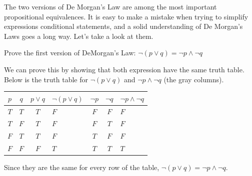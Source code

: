 The two versions of De Morgan's Law
are among the most important propositional equivalences.
It is easy to make a mistake when trying to simplify expressions conditional statements, 
and a solid understanding of De Morgan's
Laws goes a long way.  Let's take a look at them.


\begin{exa}
Prove the first version of DeMorgan's Law: 
 $\neg (p\vee q) = \neg p \wedge \neg q$
\begin{pf}
We can prove this by showing that both expression have the same truth table.
Below is the truth table for $\neg (p\vee q)$ and  $\neg p \wedge \neg q$ (the gray columns).

\centering
\begin{tabular}{|cc|c|g|c|c|g|} \hline $p$ & $q$ & $p\vee q$ &
$\neg (p\vee q)$ & $\neg p$ &
$\neg q$ & $\neg p \wedge \neg q$ \\
\hline 
$T$ & $T$ & $T$ & $F $ & $F $ & $F $ & $F$ \\
$T$ & $F$ & $T$ & $F $ & $F $ & $T $ & $F$ \\
$F$ & $T$ & $T$ & $F $ & $T $ & $F $ & $F$ \\
$F$ & $F$ & $F$ & $T $ & $T $ & $T $ & $T$ \\
\hline
\end{tabular}

Since they are the same for every row of the table,  $\neg (p\vee q) = \neg p \wedge \neg q$.
\end{pf}
\end{exa}

